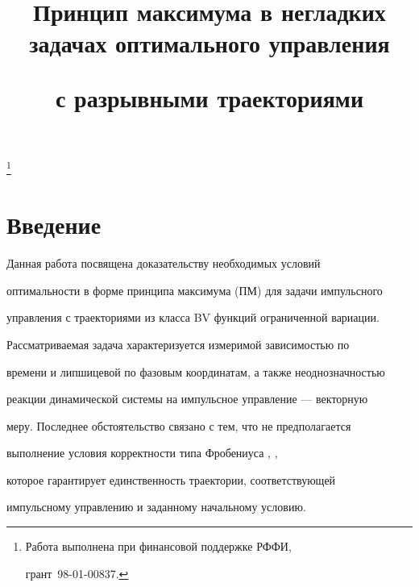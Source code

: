 \title{Принцип максимума в негладких задачах оптимального управления


с разрывными траекториями}


\thanks{Работа выполнена при финансовой поддержке  РФФИ,


грант \No\,98-01-00837.}


\date{}







\pagestyle{plain} %







\maketitle


\label{begin}





\section{Введение}





Данная работа посвящена доказательству необходимых условий


оптимальности в форме принципа максимума (ПМ) для задачи импульсного


управления с траекториями из класса BV функций ограниченной вариации.


Рассматриваемая задача характеризуется измеримой зависимостью по


времени и липшицевой по фазовым координатам, а также неоднозначностью


реакции динамической системы на импульсное управление --- векторную


меру. Последнее обстоятельство связано с тем, что не предполагается


выполнение условия корректности типа Фробениуса \cite{M82}, \cite{Zav-Ses},


которое гарантирует единственность траектории, соответствующей


импульсному управлению и заданному начальному условию.





